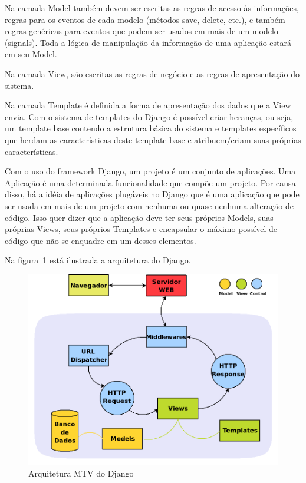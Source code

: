   Na camada Model também devem ser escritas as regras de acesso às informações, regras para os eventos de cada modelo (métodos save, delete, etc.), e também regras genéricas para eventos que podem ser usados em mais de um modelo (signals). Toda a lógica de manipulação da informação de uma aplicação estará em seu Model.

  Na camada View, são escritas as regras de negócio e as regras de apresentação do sistema.

  Na camada Template é definida a forma de apresentação dos dados que a View envia. Com o sistema de templates do Django é possível criar heranças, ou seja, um template base contendo a estrutura básica do sistema e templates específicos que herdam as características deste template base e atribuem/criam suas próprias características.

  Com o uso do framework Django, um projeto é um conjunto de aplicações. Uma Aplicação é uma determinada funcionalidade que compõe um projeto. Por causa disso, há a idéia de aplicações plugáveis no Django que é uma aplicação que pode ser usada em mais de um projeto com nenhuma ou quase nenhuma alteração de código. Isso quer dizer que a aplicação deve ter seus próprios Models, suas próprias Views, seus próprios Templates e encapsular o máximo possível de código que não se enquadre em um desses elementos.
  
  Na figura~\ref{django_arquitetura} está ilustrada a arquitetura do Django.

  \begin{figure}
      \begin{center}
	\includegraphics[width=1.0\linewidth]{arquivos/django_arquitetura.png}
      \end{center}
      \caption{Arquitetura MTV do Django}
      \label{django_arquitetura}
  \end{figure}

